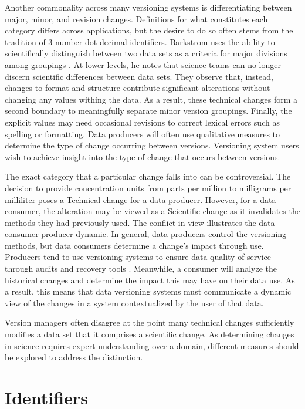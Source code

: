 Another commonality across many versioning systems is differentiating between major, minor, and revision changes.
Definitions for what constitutes each category differs across applications, but the desire to do so often stems from the tradition of 3-number dot-decimal identifiers.
Barkstrom uses the ability to scientifically distinguish between two data sets as a criteria for major divisions among groupings \cite{Barkstrom2003}.
At lower levels, he notes that science teams can no longer discern scientific differences between data sets.
They observe that, instead, changes to format and structure contribute significant alterations without changing any values withing the data.
As a result, these technical changes form a second boundary to meaningfully separate minor version groupings.
Finally, the explicit values may need occasional revisions to correct lexical errors such as spelling or formatting.
Data producers will often use qualitative measures to determine the type of change occurring between versions.
Versioning system users wish to achieve insight into the type of change that occurs between versions.

The exact category that a particular change falls into can be controversial.
The decision to provide concentration units from parts per million to milligrams per milliliter poses a Technical change for a data producer.
However, for a data consumer, the alteration may be viewed as a Scientific change as it invalidates the methods they had previously used.
The conflict in view illustrates the data consumer-producer dynamic.
In general, data producers control the versioning methods, but data consumers determine a change's impact through use.
Producers tend to use versioning systems to ensure data quality of service through audits and recovery tools \cite{Cavanaugh2002}.
Meanwhile, a consumer will analyze the historical changes and determine the impact this may have on their data use.
As a result, this means that data versioning systems must communicate a dynamic view of the changes in a system contextualized by the user of that data.

Version managers often disagree at the point many technical changes sufficiently modifies a data set that it comprises a scientific change.
As determining changes in science requires expert understanding over a domain, different measures should be explored to address the distinction.

\section{Identifiers}

